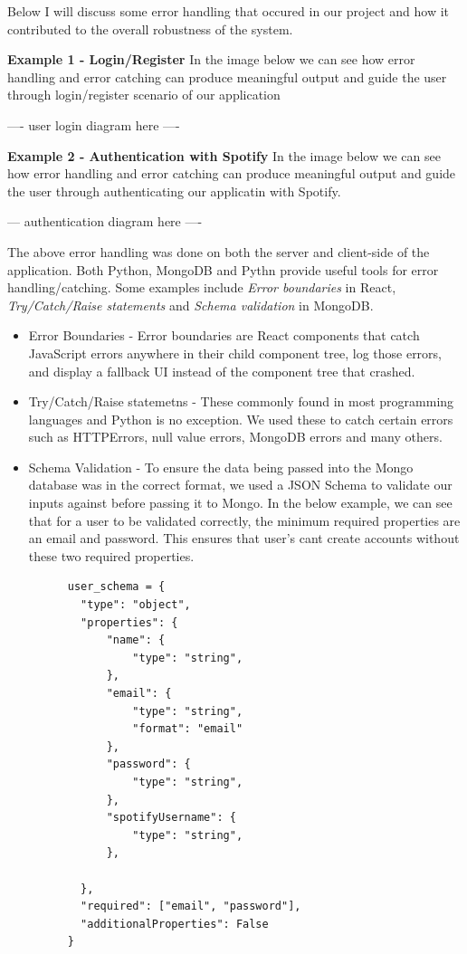     Below I will discuss some error handling that occured in our project and how it contributed to the overall robustness of the system.
    
    \textbf{Example 1 - Login/Register} 
    In the image below we can see how error handling and error catching can produce meaningful output and guide the user through login/register scenario of our application

    ---- user login diagram here ----

    \textbf{Example 2 - Authentication with Spotify}
    In the image below we can see how error handling and error catching can produce meaningful output and guide the user through authenticating our applicatin with Spotify.

    --- authentication diagram here ----


    The above error handling was done on both the server and client-side of the application. Both Python, MongoDB and Pythn provide useful tools for error handling/catching.
    Some examples include \textit{Error boundaries} in React, \textit{Try/Catch/Raise statements} and \textit{Schema validation} in MongoDB.

    \begin{itemize}
      \item Error Boundaries - Error boundaries are React components that catch JavaScript errors anywhere in their child component tree, log those errors, and display a fallback UI instead of the component tree that crashed.
      \item Try/Catch/Raise statemetns - These commonly found in most programming languages and Python is no exception. We used these to catch certain errors such as HTTPErrors, null value errors, MongoDB errors and many others.
      \item Schema Validation - To ensure the data being passed into the Mongo database was in the correct format, we used a JSON Schema to validate our inputs against before passing it to Mongo. In the below example, we can see that for a user 
      to be validated correctly, the minimum required properties are an email and password. This ensures that user's cant create accounts without these two required properties.
      \begin{verbatim}
      user_schema = {
        "type": "object",
        "properties": {
            "name": {
                "type": "string",
            },
            "email": {
                "type": "string",
                "format": "email"
            },
            "password": {
                "type": "string",
            },
            "spotifyUsername": {
                "type": "string",
            },
          
        },
        "required": ["email", "password"],
        "additionalProperties": False
      }
      \end{verbatim}
      
    \end{itemize}

